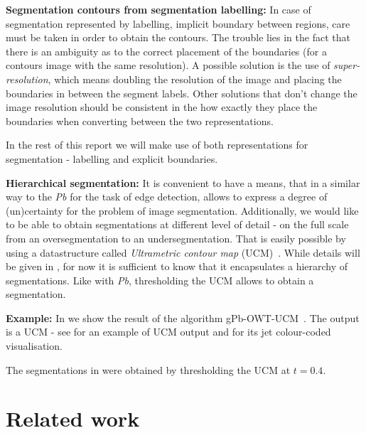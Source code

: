 \textbf{Segmentation contours from segmentation labelling:} In case of segmentation represented by labelling, \ie implicit boundary between regions, care must be taken in order to obtain the contours. The trouble lies in the fact that there is an ambiguity as to the correct placement of the boundaries (for a contours image with the same resolution). A possible solution is the use of {\it super-resolution}, which means doubling the resolution of the image and placing the boundaries in between the segment labels. Other solutions that don't change the image %
resolution should be consistent in the how exactly they place the %
boundaries when converting between the two representations.

In the rest of this report we will make use of both representations for segmentation - labelling and explicit boundaries.

\textbf{Hierarchical segmentation:} It is convenient to have a means, that in a similar way to the {\it Pb} for the task of edge detection, allows to express a degree of (un)certainty for the problem of image segmentation. Additionally, we would like to be able to obtain segmentations at different level of detail - on the full scale from an oversegmentation to an undersegmentation. That is easily possible by using a datastructure called {\it Ultrametric contour map} (UCM)~\cite{Arbelaez2006boundary}. While details will be given in , for now it is sufficient to know that it encapsulates a hierarchy of segmentations. 
Like with {\it Pb}, thresholding the UCM allows to obtain a segmentation.

\textbf{Example:} In  we show the result of the algorithm gPb-OWT-UCM~\cite{Arbelaez11}. The output is a UCM - see  for an example of UCM output and  for its jet colour-coded visualisation.

The segmentations in %
were obtained by thresholding the UCM at $t=0.4$.

\section{Related work}
